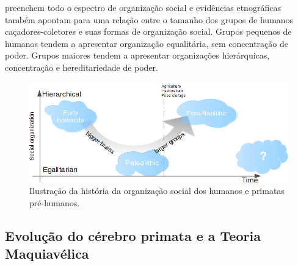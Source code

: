  preenchem todo o espectro de organização social  e evidências etnográficas também apontam para uma relação entre o tamanho dos grupos de humanos caçadores-coletores e suas formas de organização social\cite{Currie2010}. Grupos pequenos de humanos tendem a apresentar organização equalitária, sem concentração de poder. Grupos maiores tendem a apresentar organizações hierárquicas, concentração e hereditariedade de poder. 
\begin{figure}
	\centering
	\includegraphics[width = 1.05\textwidth]{figuras/ushaped.png}
	\caption{ Ilustração da história da organização social dos humanos e primatas pré-humanos.}
	\label{fig:ushaped}
\end{figure}

\subsection{Evolução do cérebro primata e a Teoria Maquiavélica}

